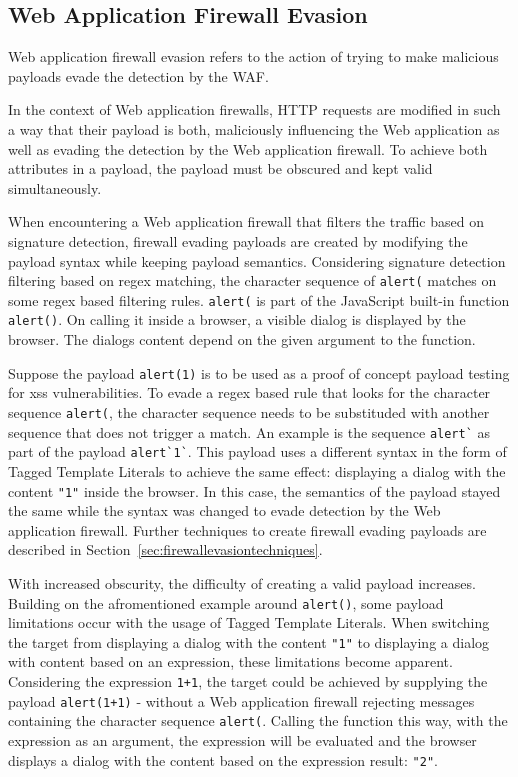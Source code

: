\subsection{Web Application Firewall Evasion}
Web application firewall evasion refers to the action of trying to make malicious payloads evade the detection by the WAF.

In the context of Web application firewalls, HTTP requests are modified in such a way that their payload is both, maliciously influencing the Web application as well as evading the detection by the Web application firewall. To achieve both attributes in a payload, the payload must be obscured and kept valid simultaneously. 

When encountering a Web application firewall that filters the traffic based on signature detection, firewall evading payloads are created by modifying the payload syntax while keeping payload semantics. Considering signature detection filtering based on regex matching, the character sequence of \verb|alert(| matches on some regex based filtering rules. \verb|alert(| is part of the JavaScript built-in function \verb|alert()|. On calling it inside a browser, a visible dialog is displayed by the browser. The dialogs content depend on the given argument to the function. 

Suppose the payload \verb|alert(1)| is to be used as a proof of concept payload testing for \gls{xss} vulnerabilities.
To evade a regex based rule that looks for the character sequence \verb|alert(|, the character sequence needs to be substituded with another sequence that does not trigger a match. An example is the sequence \verb|alert`| as part of the payload \verb|alert`1`|. This payload uses a different syntax in the form of Tagged Template Literals to achieve the same effect: displaying a dialog with the content \verb|"1"| inside the browser.
In this case, the semantics of the payload stayed the same while the syntax was changed to evade detection by the Web application firewall.
Further techniques to create firewall evading payloads are described in Section~\ref{sec:firewallevasiontechniques}.

With increased obscurity, the difficulty of creating a valid payload increases. Building on the afromentioned example around \verb|alert()|, some payload limitations occur with the usage of Tagged Template Literals. When switching the target from displaying a dialog with the content \verb|"1"| to displaying a dialog with content based on an expression, these limitations become apparent. Considering the expression \verb|1+1|, the target could be achieved by supplying the payload \verb|alert(1+1)| - without a Web application firewall rejecting messages containing the character sequence \verb|alert(|. Calling the function this way, with the expression as an argument, the expression will be evaluated and the browser displays a dialog with the content based on the expression result: \verb|"2"|.

